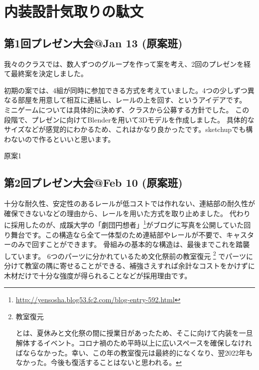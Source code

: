 \documentclass[uplatex,dvipdfmx]{jsarticle}
\begin{document}
\section{内装設計気取りの駄文}

\subsection{第1回プレゼン大会@Jan 13 (原案班)}

我々のクラスでは、数人ずつのグループを作って案を考え、2回のプレゼンを経て最終案を決定しました。

初期の案では、4組が同時に参加できる方式を考えていました。4つの少しずつ異なる部屋を用意して相互に連結し、レールの上を回す、というアイデアです。
ミニゲームについては具体的に決めず、クラスから公募する方針でした。
この段階で、プレゼンに向けてBlenderを用いて3Dモデルを作成しました。
具体的なサイズなどが感覚的にわかるため、これはかなり良かったです。sketchupでも構わないので作るといいと思います。

\begin{imageHere}{原案1}
\end{imageHere}

\clearpage

\subsection{第2回プレゼン大会@Feb 10 (原案班)}

十分な耐久性、安定性のあるレールが低コストでは作れない、連結部の耐久性が確保できないなどの理由から、レールを用いた方式を取り止めました。
代わりに採用したのが、成蹊大学の「劇団円想者」\footnote{\url{http://yensosha.blog53.fc2.com/blog-entry-592.html}}がブログに写真を公開していた回り舞台です。この構造なら全て一体型のため連結部やレールが不要で、キャスターのみで回すことができます。
骨組みの基本的な構造は、最後までこれを踏襲しています。
6つのパーツに分かれているため文化祭前の教室復元
    \footnote{\hypertarget{note:教室復元}{教室復元}とは、夏休みと文化祭の間に授業日があったため、そこに向けて内装を一旦解体するイベント。コロナ禍のため平時以上に広いスペースを確保しなければならなかった。幸い、この年の教室復元は最終的になくなり、翌2022年もなかった。今後も復活することはないと思われる。}
でパーツに分けて教室の隅に寄せることができる、補強さえすれば余計なコストをかけずに木材だけで十分な強度が得られることなどが採用理由です。
\end{document}
